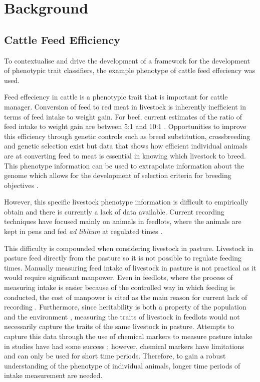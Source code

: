 \chapter{Background}

\section{Cattle Feed Efficiency}
To contextualise and drive the development of a framework for the development of phenotypic trait classifiers, the example phenotype of cattle feed effeciency was used. 

Feed effeciency in cattle is a phenotypic trait that is important for cattle manager. Conversion of feed to red meat in livestock is inherently inefficient in terms of feed intake to weight gain. For beef, current estimates of the ratio of feed intake to weight gain are between 5:1 and 10:1 \cite{Garnett2009}. Opportunities to improve this efficiency through genetic controls such as breed substitution, crossbreeding and genetic selection exist \cite{Hill2012} but data that shows how efficient individual animals are at converting feed to meat is essential in knowing which livestock to breed. This phenotype information can be used to extrapolate information about the genome which allows for the development of selection criteria for breeding objectives \cite{Pollak2012}.  

However, this specific livestock phenotype information is difficult to empirically obtain and there is currently a lack of data available. Current recording techniques have focused mainly on animals in feedlots, where the animals are kept in pens and fed \textit{ad libitum} at regulated times \cite{Arthur2005}.

This difficulty is compounded when considering livestock in pasture. Livestock in pasture feed directly from the pasture so it is not possible to regulate feeding times. Manually measuring feed intake of livestock in pasture is not practical as it would require significant manpower. Even in feedlots, where the process of measuring intake is easier because of the controlled way in which feeding is conducted, the cost of manpower is cited as the main reason for current lack of recording \cite{Barwick2010}. Furthermore, since heritability is both a property of the population and the environment \cite{Falconer1996}, measuring the traits of livestock in feedlots would not necessarily capture the traits of the same livestock in pasture. Attempts to capture this data through the use of chemical  markers to measure pasture intake in studies have had some success \cite{Barlow2009} \cite{Dove2006}; however, chemical markers have limitations and can only be used for short time periods. Therefore, to gain a robust understanding of the phenotype of individual animals, longer time periods of intake measurement are needed.

